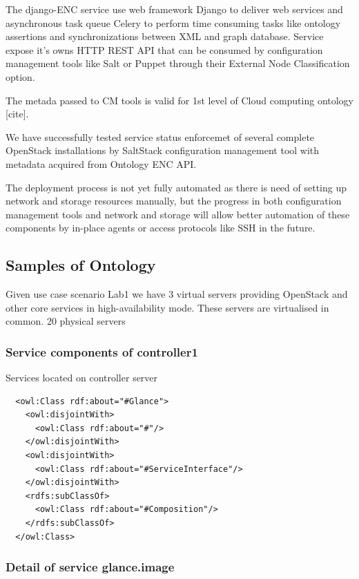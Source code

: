 The django-ENC service  use  web framework Django to deliver web services and asynchronous task queue Celery to perform time consuming tasks like ontology assertions and synchronizations between XML and graph database. Service expose it's owns HTTP REST API that can be consumed by configuration management tools like Salt or Puppet through their External Node Classification option.

The metada passed to CM tools is valid for 1st level of Cloud computing ontology [cite].

We have successfully tested service status enforcemet of several complete OpenStack installations by SaltStack configuration management tool with metadata acquired from Ontology ENC API.

The deployment process is not yet fully automated as there is need of setting up network and storage resources manually, but the progress in both configuration management tools and network and storage will allow better automation of these components by in-place agents or access protocols like SSH in the future.

\subsection{Samples of Ontology}

Given use case scenario Lab1 we have 3 virtual servers providing OpenStack and other core services in high-availability mode. These servers are virtualised in common. 20 physical servers  

\subsubsection{Service components of controller1}

Services located on controller server

\begin{lstlisting}
  <owl:Class rdf:about="#Glance">
    <owl:disjointWith>
      <owl:Class rdf:about="#"/>
    </owl:disjointWith>
    <owl:disjointWith>
      <owl:Class rdf:about="#ServiceInterface"/>
    </owl:disjointWith>
    <rdfs:subClassOf>
      <owl:Class rdf:about="#Composition"/>
    </rdfs:subClassOf>
  </owl:Class>
\end{lstlisting}

\subsubsection{Detail of service glance.image}

